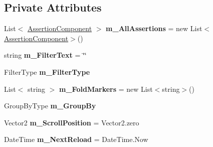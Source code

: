 \subsection*{Private Attributes}
\begin{DoxyCompactItemize}
\item 
\mbox{\label{class_unity_test_1_1_assertion_explorer_window_a49edb51316c67452cca6adcb9bf912fd}} 
List$<$ \hyperlink{class_unity_test_1_1_assertion_component}{Assertion\+Component} $>$ {\bfseries m\+\_\+\+All\+Assertions} = new List$<$\hyperlink{class_unity_test_1_1_assertion_component}{Assertion\+Component}$>$()
\item 
\mbox{\label{class_unity_test_1_1_assertion_explorer_window_abef7b2207694d5ea24b294e15daaa357}} 
string {\bfseries m\+\_\+\+Filter\+Text} = \char`\"{}\char`\"{}
\item 
\mbox{\label{class_unity_test_1_1_assertion_explorer_window_af100c16ab6424ca9eaa82309ed81d2d3}} 
Filter\+Type {\bfseries m\+\_\+\+Filter\+Type}
\item 
\mbox{\label{class_unity_test_1_1_assertion_explorer_window_a3d09ba36559b9ce618a5f027256ae20b}} 
List$<$ string $>$ {\bfseries m\+\_\+\+Fold\+Markers} = new List$<$string$>$()
\item 
\mbox{\label{class_unity_test_1_1_assertion_explorer_window_a401b54d8cd37191ce10bc8fae02d3285}} 
Group\+By\+Type {\bfseries m\+\_\+\+Group\+By}
\item 
\mbox{\label{class_unity_test_1_1_assertion_explorer_window_a6321a991de8b28b41abb70c1ae09e671}} 
Vector2 {\bfseries m\+\_\+\+Scroll\+Position} = Vector2.\+zero
\item 
\mbox{\label{class_unity_test_1_1_assertion_explorer_window_a58f2f431b03b57d7b833666d8619757a}} 
Date\+Time {\bfseries m\+\_\+\+Next\+Reload} = Date\+Time.\+Now
\item 
\mbox{\label{class_unity_test_1_1_assertion_explorer_window_a56b71a010269fa9147f255e213677f2f}} 

\end{DoxyCompactItemize}
